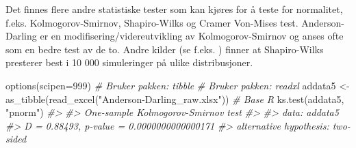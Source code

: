 \documentclass[
]{article}
\newenvironment{Shaded}{\begin{snugshade}}{\end{snugshade}}
\newcommand{\AttributeTok}[1]{\textcolor[rgb]{0.77,0.63,0.00}{#1}}
\newcommand{\CommentTok}[1]{\textcolor[rgb]{0.56,0.35,0.01}{\textit{#1}}}
\newcommand{\DecValTok}[1]{\textcolor[rgb]{0.00,0.00,0.81}{#1}}
\newcommand{\FunctionTok}[1]{\textcolor[rgb]{0.00,0.00,0.00}{#1}}
\newcommand{\NormalTok}[1]{#1}
\newcommand{\OtherTok}[1]{\textcolor[rgb]{0.56,0.35,0.01}{#1}}
\newcommand{\SpecialCharTok}[1]{\textcolor[rgb]{0.00,0.00,0.00}{#1}}
\newcommand{\StringTok}[1]{\textcolor[rgb]{0.31,0.60,0.02}{#1}}
\begin{document}
Det finnes flere andre statistiske tester som kan kjøres for å teste for normalitet, f.eks. Kolmogorov-Smirnov, Shapiro-Wilks og Cramer Von-Mises test. Anderson-Darling er en modifisering/videreutvikling av Kolmogorov-Smirnov og anses ofte som en bedre test av de to. Andre kilder (se f.eks. \citet{razaliPowerComparisonsShapiroWilk2011}) finner at Shapiro-Wilks presterer best i 10 000 simuleringer på ulike distribusjoner.

\begin{Shaded}
\begin{Highlighting}[]
\FunctionTok{options}\NormalTok{(}\AttributeTok{scipen=}\DecValTok{999}\NormalTok{)}
\CommentTok{\# Bruker pakken: tibble}
\CommentTok{\# Bruker pakken: readxl}
\NormalTok{addata5 }\OtherTok{\textless{}{-}} \FunctionTok{as\_tibble}\NormalTok{(}\FunctionTok{read\_excel}\NormalTok{(}\StringTok{"Anderson{-}Darling\_raw.xlsx"}\NormalTok{))}
\CommentTok{\# Base R}
\FunctionTok{ks.test}\NormalTok{(addata5, }\StringTok{"pnorm"}\NormalTok{)}
\CommentTok{\#\textgreater{} }
\CommentTok{\#\textgreater{}  One{-}sample Kolmogorov{-}Smirnov test}
\CommentTok{\#\textgreater{} }
\CommentTok{\#\textgreater{} data:  addata5}
\CommentTok{\#\textgreater{} D = 0.88493, p{-}value = 0.0000000000000171}
\CommentTok{\#\textgreater{} alternative hypothesis: two{-}sided}
\end{Highlighting}
\end{Shaded}

\begin{Shaded}
\end{Shaded}

\begin{Shaded}
\end{Shaded}
\end{document}
